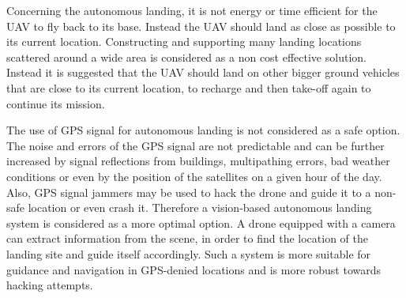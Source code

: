 \documentclass[conference]{IEEEtran}
\begin{document}

Concerning the autonomous landing, it is not energy or time efficient for the UAV to fly back to its base. Instead the UAV should land as close as possible to its current location. Constructing and supporting many landing locations scattered around a wide area is considered as a non cost effective solution. 
Instead it is suggested that the UAV should land on other bigger ground vehicles that are close to its current location, to recharge and then take-off again to continue its mission. 

The use of
GPS signal for autonomous landing is not
considered as a safe option. The noise and errors of the GPS signal are not predictable and can be further increased by signal reflections from buildings, multipathing errors, bad weather 
conditions or even by the position of the satellites on a given hour of the day. 
Also, GPS signal jammers may be used to hack the drone and guide it to a non-safe location or even crash it. 
Therefore a vision-based autonomous landing system is 
considered as a more optimal option. A drone equipped with a camera can extract information from the
scene, in order to find the location of the landing site and guide itself accordingly. Such a system is more suitable for guidance and navigation in GPS-denied locations and is more robust towards hacking attempts.
\end{document}

